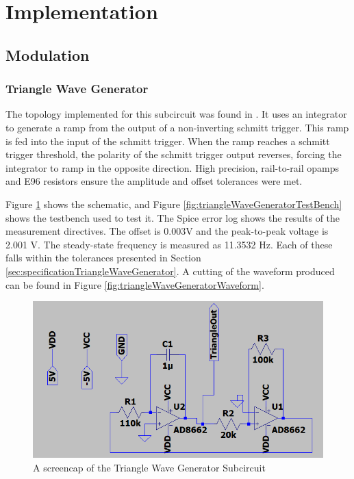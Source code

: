 \section{Implementation}
\label{sec:implementation}

\subsection{Modulation}
\subsubsection{Triangle Wave Generator}
The topology implemented for this subcircuit was found in \cite{TriangleWaveTopology}. 
It uses an integrator to generate a ramp from the output of a non-inverting schmitt trigger. 
This ramp is fed into the input of the schmitt trigger. When the ramp reaches a schmitt trigger threshold, the polarity of the schmitt trigger output reverses, forcing the integrator to ramp in the opposite direction. 
High precision, rail-to-rail opamps and E96 resistors ensure the amplitude and offset tolerances were met. 

Figure \ref{fig:triangleWaveGeneratorSchematic} shows the schematic, and Figure \ref{fig:triangleWaveGeneratorTestBench} shows the testbench used to test it. 
The Spice error log shows the results of the measurement directives.
The offset is 0.003V and the peak-to-peak voltage is 2.001 V.
The steady-state frequency is measured as 11.3532 Hz.
Each of these falls within the tolerances presented in Section \ref{sec:specificationTriangleWaveGenerator}.
A cutting of the waveform produced can be found in Figure \ref{fig:triangleWaveGeneratorWaveform}. 


\begin{figure}[H]
    \centering 
    \includegraphics[width=\textwidth]{../Circuits/Images/TriangleWaveGenerator/schematic}
    \caption{A screencap of the Triangle Wave Generator Subcircuit}
    \label{fig:triangleWaveGeneratorSchematic}
\end{figure}

